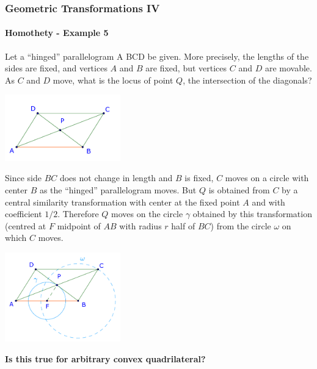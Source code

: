 \documentclass[8pt,xcolor=table,dvipsnames]{beamer}
\begin{document}
\begin{frame}[t]
    \frametitle{Geometric Transformations IV}
    \framesubtitle{Homothety - Example 5}
    \begin{overprint}
        \begin{example}
            Let a “hinged” parallelogram A BCD be given. More precisely, the lengths of the sides are fixed, and vertices $A$ and $B$ are fixed, but vertices $C$ and $D$ are movable.
            \bigbreak
            As $C$ and $D$ move, what is the locus of point $Q$, the intersection of the diagonals?
        \end{example}
        \begin{center}
            \includegraphics[width=5cm]{./svg/pdf/homothety-p5a.pdf}
        \end{center}
        Since side $BC$ does not change in length and $B$ is fixed, $C$ moves on a circle with center $B$ as the “hinged” parallelogram moves.
        But $Q$ is obtained from $C$ by a central similarity transformation with center at the fixed point $A$ and with coefficient $1/2$.
        Therefore $Q$ moves on the circle $\gamma$ obtained by this transformation (centred at $F$ midpoint of $AB$ with radius $r$ half of $BC$)
        from the circle $\omega$ on which $C$ moves.
        \begin{center}
            \includegraphics[width=5cm]{./svg/pdf/homothety-p5b.pdf}
        \end{center}
        \textbf{Is this true for arbitrary convex quadrilateral?} 
    \end{overprint}
\end{frame}
\end{document}
